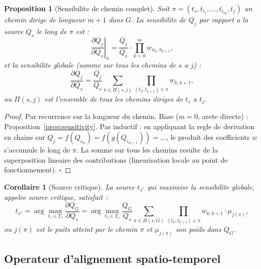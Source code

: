 \documentclass[12pt,a4paper]{article}
\theoremstyle{plain}
\newtheorem{proposition}[theorem]{Proposition}
\newtheorem{corollary}[theorem]{Corollaire}
\theoremstyle{definition}
\theoremstyle{remark}
\begin{document}
\begin{proposition}[Sensibilite de chemin complet]
\label{prop:path_sensitivity}
Soit $\pi = (t_{s}, t_{i_1}, \ldots, t_{i_m}, t_j)$ un chemin dirige
de longueur $m+1$ dans $G$. La sensibilite de $Q_j$ par rapport
a la source $Q_s$ le long de $\pi$ est :
\begin{equation}
\left.\frac{\partial Q_j}{\partial Q_s}\right|_\pi
= \frac{Q_j}{Q_s}
  \cdot \prod_{k=0}^{m} w_{\pi_k, \pi_{k+1}},
\label{eq:sens_path}
\end{equation}
et la sensibilite globale (somme sur tous les chemins de $s$ a $j$) :
\begin{equation}
\frac{\partial Q_j}{\partial Q_s}
= \frac{Q_j}{Q_s}
  \sum_{\pi \in \Pi(s,j)}
  \prod_{(t_k,t_{k+1})\in\pi} w_{k,k+1},
\label{eq:sens_global}
\end{equation}
ou $\Pi(s,j)$ est l'ensemble de tous les chemins diriges de $t_s$ a $t_j$.
\end{proposition}

\begin{proof}
Par recurrence sur la longueur du chemin.
Base ($m=0$, arete directe) : Proposition~\ref{prop:sensitivity}.
Pas inductif : en appliquant la regle de derivation en chaine sur
$Q_j = f(Q_{i_m}) = f(g(Q_{i_{m-1}})) = \ldots$, le produit des
coefficients $w$ s'accumule le long de $\pi$.
La somme sur tous les chemins resulte de la superposition lineaire
des contributions (linearisation locale au point de fonctionnement).
\hfill$\square$
\end{proof}

\begin{corollary}[Source critique]
\label{cor:critical_source}
La source $t_{s^*}$ qui maximise la sensibilite globale, appelee
\emph{source critique}, satisfait :
\begin{equation}
t_{s^*} = \arg\max_{t_s \in T_s}
\frac{\partial Q_G}{\partial Q_s}
= \arg\max_{t_s \in T_s}
\frac{Q_G}{Q_s}
\sum_{\pi \in \Pi(s,G)} \prod_{(t_k,t_{k+1})\in\pi} w_{k,k+1} \cdot \mu_{j(\pi)},
\label{eq:critical}
\end{equation}
ou $j(\pi)$ est le puits atteint par le chemin $\pi$ et $\mu_{j(\pi)}$
son poids dans $Q_G$.
\end{corollary}

\subsection{Operateur d'alignement spatio-temporel}
\label{subsec:sta_formal}
\end{document}
